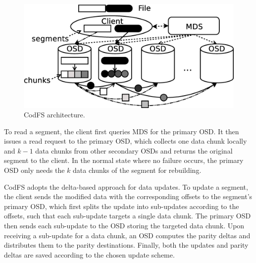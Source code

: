 \begin{figure}[t]
    \centering
    \includegraphics[width=0.9\linewidth]{figs/architecture}
    \vspace{-3pt}
    \caption{CodFS architecture.} %
    \label{fig:architecture}
\end{figure}

To read a segment, the client first queries MDS for the primary OSD.  It then
issues a read request to the primary OSD, which collects one data chunk
locally and $k-1$ data chunks from other secondary OSDs and returns the
original segment to the client. In the normal state where no failure occurs,
the primary OSD only needs the $k$ data chunks of the segment for rebuilding. 

CodFS adopts the delta-based approach for data updates.  
To update a segment, the client sends the modified data with the corresponding offsets
to the segment's primary OSD, which 
first splits the update into sub-updates according to the offsets, 
such that each sub-update targets a single data chunk. The primary OSD then 
sends each sub-update to the OSD storing the targeted data chunk.
Upon receiving a sub-update for a data chunk, an OSD computes the parity
deltas and distributes them to the parity destinations. Finally, both the updates and 
parity deltas are saved according to the chosen update scheme.


